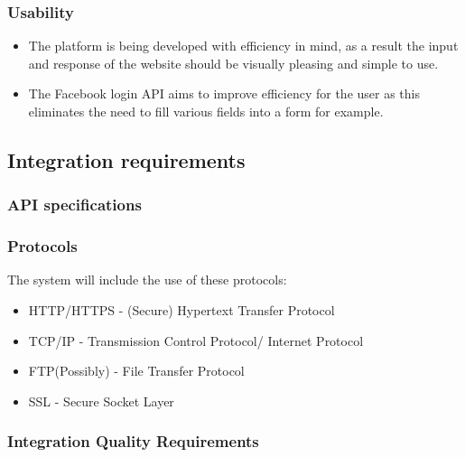 \documentclass{article}
\begin{document}
		\subsubsection{Usability}
		\begin{itemize}
			\item The platform is being developed with efficiency in mind, as a result the input and response of the website should be visually pleasing and simple to use.
			\item The Facebook login API aims to improve efficiency for the user as this eliminates the need to fill various fields into a form for example.
		\end{itemize}
		 

		

	\subsection{Integration requirements}
		\subsubsection{API specifications}	
		\subsubsection{Protocols}
		The system will include the use of these protocols:
		\begin{itemize}
			\item HTTP/HTTPS - (Secure) Hypertext Transfer Protocol
			\item TCP/IP - Transmission Control Protocol/ Internet Protocol
			\item FTP(Possibly) - File Transfer Protocol
			\item SSL - Secure Socket Layer 
		\end{itemize}
		\subsubsection{Integration Quality Requirements}

	
\end{document}
